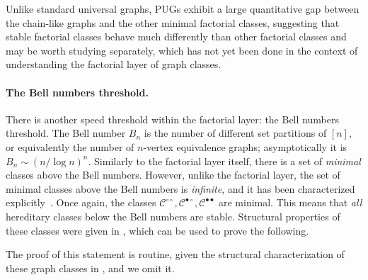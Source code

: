\documentclass{article}
\makeatletter
\newcommand{\cC}{\ensuremath{\mathcal{C}}}
\newcommand{\cF}{\ensuremath{\mathcal{F}}}
\newcommand*\chainyGraphs{chain-like graphs\xspace}
\newcommand{\dcirc}{{\circ\circ}}
\newcommand{\bcirc}{{\bullet\circ}}
\newcommand{\dbullet}{{\bullet\bullet}}
\newcommand\IfRestateTF{%
  \ifx\label\thmt@gobble@label %
    \expandafter\@firstoftwo
  \else
    \expandafter\@secondoftwo
  \fi
}
\newcommand{\RestateRemark}{\IfRestateTF{{\normalfont\bfseries (Restated) }}{}}
\makeatother
\begin{document}
Unlike standard universal graphs, PUGs exhibit a large quantitative gap between the \chainyGraphs
and the other minimal factorial classes, suggesting that stable factorial classes behave much differently than other factorial classes and may be worth studying separately, which has not yet been done in the context of understanding the factorial layer of graph classes.


\paragraph*{The Bell numbers threshold.}
There is another speed threshold within the factorial layer: the Bell numbers threshold.
The Bell number $B_n$ is the number of different set partitions of $[n]$, or equivalently the number
of $n$-vertex equivalence graphs; asymptotically it is $B_n \sim (n / \log n)^n$. Similarly to the
factorial layer itself, there is a set of \emph{minimal} classes above the Bell numbers.  However,
unlike the factorial layer, the set of minimal classes above the Bell numbers is \emph{infinite},
and it has been characterized explicitly~\cite{BBW05,ACFL16}. Once again, the classes $\cC^\dcirc,
\cC^\bcirc, \cC^\dbullet$ are minimal. This means that \emph{all} hereditary classes below the Bell
numbers are stable. Structural properties of these classes were given in \cite{BBW00}, which can be
used to prove the following.


The proof of this statement is routine, given the structural characterization of these graph classes
in \cite{BBW00,BBW05,ACFL16}, and we omit it.
\end{document}
